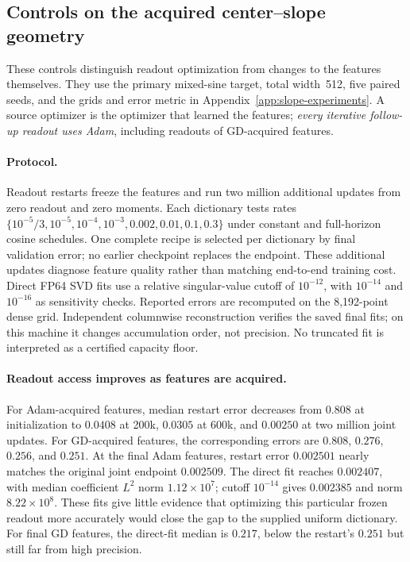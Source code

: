 \subsection{Controls on the acquired center--slope geometry}
\label{app:geometry-controls}

These controls distinguish readout optimization from changes to the features
themselves. They use the primary mixed-sine target, total width~512, five
paired seeds, and the grids and error metric in
Appendix~\ref{app:slope-experiments}. A source optimizer is the optimizer that
learned the features; \emph{every iterative follow-up readout uses Adam},
including readouts of GD-acquired features.

\paragraph{Protocol.}
Readout restarts freeze the features and run two million additional updates
from zero readout and zero moments. Each dictionary tests rates
$\{10^{-5}/3,10^{-5},10^{-4},10^{-3},0.002,0.01,0.1,0.3\}$ under constant
and full-horizon cosine schedules. One complete recipe is selected per
dictionary by final validation error; no earlier checkpoint replaces the
endpoint. These additional updates diagnose feature quality rather than
matching end-to-end training cost. Direct FP64 SVD fits use a relative
singular-value cutoff of $10^{-12}$, with $10^{-14}$ and $10^{-16}$ as
sensitivity checks. Reported errors are recomputed on the 8,192-point dense
grid. Independent columnwise reconstruction verifies the saved final fits;
on this machine it changes accumulation order, not precision. No truncated
fit is interpreted as a certified capacity floor.

\paragraph{Readout access improves as features are acquired.}
For Adam-acquired features, median restart error decreases from $0.808$ at
initialization to $0.0408$ at 200k, $0.0305$ at 600k, and $0.00250$ at two
million joint updates. For GD-acquired features, the corresponding errors
are $0.808$, $0.276$, $0.256$, and $0.251$. At the final Adam features,
restart error $0.002501$ nearly matches the original joint endpoint
$0.002509$. The direct fit reaches $0.002407$, with median coefficient
$L^2$ norm $1.12\times10^7$; cutoff $10^{-14}$ gives $0.002385$ and norm
$8.22\times10^8$. These fits give little evidence that optimizing this
particular frozen readout more accurately would close the gap to the
supplied uniform dictionary. For final GD features, the direct-fit median
is $0.217$, below the restart's $0.251$ but still far from high precision.

